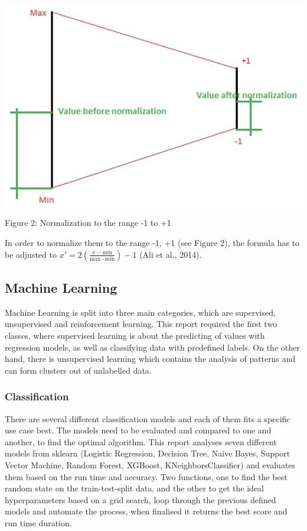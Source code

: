 \documentclass{article}
\begin{document}
\begin{multicols}{2}
\includegraphics[scale=.3]{img/norm2.png}

{\small
  Figure 2: Normalization to the range -1 to +1
  \par
  \vspace{6pt}
}


In order to normalize them to the range -1, +1 (see Figure 2), the formula has to be adjusted to \(x' = 2 \left( \frac{x - \text{min}}{\text{max} - \text{min}} \right) - 1\) (Ali et al., 2014).


\subsection{Machine Learning}

Machine Learning is split into three main categories, which are supervised, unsupervised and reinforcement learning. This report required the first two classes, where supervised learning is about the predicting of values with regression models, as well as classifying data with predefined labels. On the other hand, there is unsupervised learning which contains the analysis of patterns and can form clusters out of unlabelled data.

\subsubsection{Classification}

There are several different classification models and each of them fits a specific use case best. 
The models need to be evaluated and compared to one and another, to find the optimal algorithm. This report analyses seven different models from sklearn (Logistic Regression, Decision Tree, Naive Bayes, Support Vector Machine, Random Forest, XGBoost, KNeighborsClassifier) and evaluates them based on the run time and accuracy. 
Two functions, one to find the best random state on the train-test-split data, and the other to get the ideal hyperparameters based on a grid search, loop through the previous defined models and automate the process, when finalised it returns the best score and run time duration.


\end{multicols}
\end{document}
